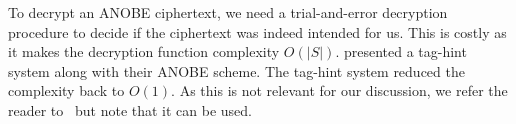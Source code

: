 To decrypt an \ac{ANOBE} ciphertext, we need a trial-and-error decryption 
procedure to decide if the ciphertext was indeed intended for us.
This is costly as it makes the decryption function complexity \(O(|S|)\).
\citet{ANOBE} presented a tag-hint system along with their \ac{ANOBE} scheme.
The tag-hint system reduced the complexity back to \(O(1)\).
As this is not relevant for our discussion, we refer the reader to~\cite{ANOBE} 
but note that it can be used.

